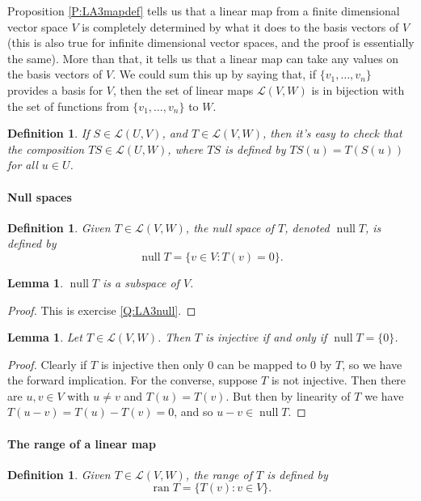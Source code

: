 \documentclass{article}
\theoremstyle{plain}
\newtheorem{definition}[theorem]{Definition}{\bfseries}{\upshape}
\newtheorem{lemma}[theorem]{Lemma}{\bfseries}{\upshape}
\newcommand{\cL}{\mathcal{L}}
\DeclareMathOperator{\nul}{\mathrm{null}}
\DeclareMathOperator{\ran}{\mathrm{ran}}
\begin{document}
 Proposition \ref{P:LA3mapdef} tells us that a linear map from a finite dimensional vector space $V$ is completely determined by what it does to the basis vectors of $V$ (this is also true for infinite dimensional vector spaces, and the proof is essentially the same). More than that, it tells us that a linear map can take any values on the basis vectors of $V$. We could sum this up by saying that, if $\{v_1,\ldots,v_n\}$ provides a basis for $V$, then the set of linear maps $\cL(V,W)$ is in bijection with the set of functions from $\{v_1,\ldots,v_n\}$ to $W$. 

\begin{definition}
If $S\in \cL(U,V)$, and $T\in\cL(V,W)$, then it's easy to check that the composition $TS\in \cL(U,W)$, where $TS$ is defined by $TS(u) = T(S(u))$ for all $u\in U$.
\end{definition}

\paragraph{Null spaces}
\begin{definition}
Given $T\in\cL(V,W)$, the \emph{null space} of $T$, denoted $\nul T$, is defined by
\[\nul T = \{v\in V: T(v) = 0\}.\]
\end{definition}

\begin{lemma}\label{L:LA3null}
$\nul T$ is a subspace of $V$.
\end{lemma}
\begin{proof}
This is exercise \ref{Q:LA3null}.
\end{proof}

\begin{lemma}
Let $T\in\cL(V,W)$. Then $T$ is injective if and only if $\nul T = \{0\}$.
\end{lemma}
\begin{proof}
Clearly if $T$ is injective then only $0$ can be mapped to $0$ by $T$, so we have the forward implication. For the converse, suppose $T$ is not injective. Then there are $u,v\in V$ with $u\neq v$ and $T(u)=T(v)$. But then by linearity of $T$ we have $T(u-v) = T(u) - T(v) =0$, and so $u-v\in \nul T$.
\end{proof}

\paragraph{The range of a linear map}
\begin{definition}
Given $T\in\cL(V,W)$, the \emph{range} of $T$ is defined by
\[\ran T = \{T(v) : v\in V\}.\]
\end{definition}
\end{document}
